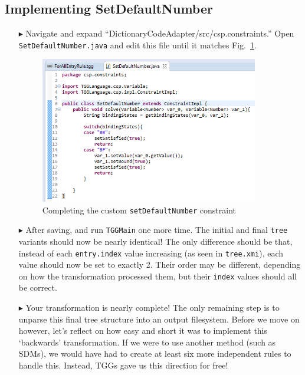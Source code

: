 \newpage
\hypertarget{common cspConstraint}{}
\subsection{Implementing SetDefaultNumber}
\genHeader

\begin{itemize}

\item[$\blacktriangleright$]  Navigate and expand ``DictionaryCodeAdapter/src/csp.constraints.'' Open \texttt{SetDefaultNumber.java} and edit this file until it
matches Fig.~\ref{eclipse:setDefaultImpl}.

\vspace{0.5cm}

\begin{figure}[htbp]
\begin{center}
  \includegraphics[width=0.9\textwidth]{eclipse_setDefaultNumberImplementation}
  \caption{Completing the custom \texttt{setDefaultNumber} constraint}
  \label{eclipse:setDefaultImpl}
\end{center}
\end{figure}

\item[$\blacktriangleright$] After saving, and run \texttt{TGGMain} one more time. The initial and final \texttt{tree} variants should now be nearly
identical! The only difference should be that, instead of each \texttt{entry.index} value increasing (as seen in \texttt{tree.xmi}), each value should now be
set to exactly 2. Their order may be different, depending on how the transformation processed them, but their \texttt{index} values should all  be correct.

\vspace{0.5cm}

\item[$\blacktriangleright$] Your transformation is nearly complete! The only remaining step is to unparse this final tree structure into an output filesystem.
Before we move on however, let's reflect on how easy and short it was to implement this `backwards' transformation. If we were to use another method (such as
SDMs), we would have had to create at least six more independent rules to handle this. Instead, TGGs gave us this direction for free!

\end{itemize}
